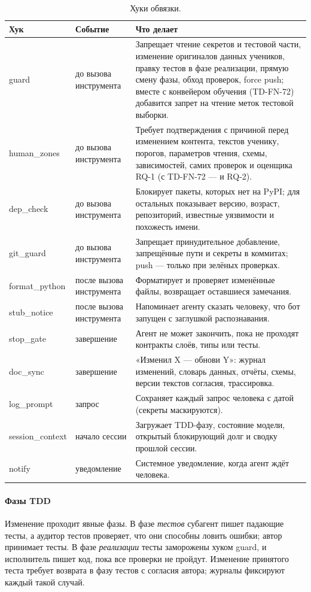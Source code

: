 \begin{table}[ht]
\centering\small
\caption{Хуки обвязки.}
\label{tab:hooks}
\begin{tabularx}{\linewidth}{@{}P{3.0cm}P{2.6cm}L@{}}
\toprule
Хук & Событие & Что делает \\
\midrule
guard & до вызова инструмента & Запрещает чтение секретов и тестовой части, изменение оригиналов данных учеников, правку тестов в фазе
реализации, прямую смену фазы, обход проверок, force push; вместе с конвейером обучения (TD-FN-72)
добавится запрет на чтение меток тестовой выборки. \\
human\_zones & до вызова инструмента & Требует подтверждения с причиной перед изменением контента, текстов
ученику, порогов, параметров чтения, схемы, зависимостей, самих проверок и оценщика RQ-1 (с TD-FN-72 --- и RQ-2). \\
dep\_check & до вызова инструмента & Блокирует пакеты, которых нет на PyPI; для остальных показывает
версию, возраст, репозиторий, известные уязвимости и похожесть имени. \\
git\_guard & до вызова инструмента & Запрещает принудительное добавление, запрещённые пути и секреты в
коммитах; push --- только при зелёных проверках. \\
format\_python & после вызова инструмента & Форматирует и проверяет изменённые файлы, возвращает
оставшиеся замечания. \\
stub\_notice & после вызова инструмента & Напоминает агенту сказать человеку, что бот запущен с
заглушкой распознавания. \\
stop\_gate & завершение & Агент не может закончить, пока не проходят контракты слоёв, типы или тесты. \\
doc\_sync & завершение & «Изменил X --- обнови Y»: журнал изменений, словарь данных, отчёты, схемы,
версии текстов согласия, трассировка. \\
log\_prompt & запрос & Сохраняет каждый запрос человека с датой (секреты маскируются). \\
session\_context & начало сессии & Загружает TDD-фазу, состояние модели, открытый блокирующий долг и
сводку прошлой сессии. \\
notify & уведомление & Системное уведомление, когда агент ждёт человека. \\
\bottomrule
\end{tabularx}
\end{table}

\paragraph{Фазы TDD} Изменение проходит явные фазы. В фазе \emph{тестов} субагент пишет падающие тесты, а
аудитор тестов проверяет, что они способны ловить ошибки; автор принимает тесты. В фазе \emph{реализации}
тесты заморожены хуком guard, и исполнитель пишет код, пока все проверки не пройдут. Изменение принятого
теста требует возврата в фазу тестов с согласия автора; журналы фиксируют каждый такой случай.


